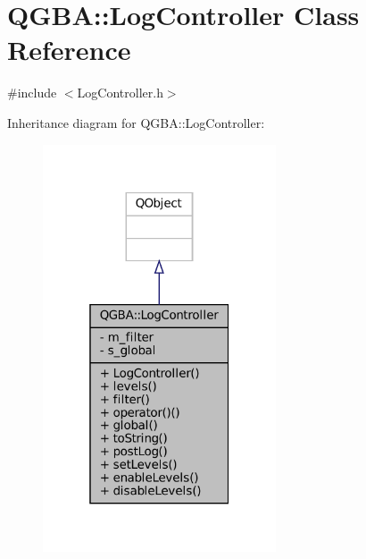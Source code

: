\hypertarget{class_q_g_b_a_1_1_log_controller}{}\section{Q\+G\+BA\+:\+:Log\+Controller Class Reference}
\label{class_q_g_b_a_1_1_log_controller}


{\ttfamily \#include $<$Log\+Controller.\+h$>$}



Inheritance diagram for Q\+G\+BA\+:\+:Log\+Controller\+:
\nopagebreak
\begin{figure}[H]
\begin{center}
\leavevmode
\includegraphics[width=196pt]{class_q_g_b_a_1_1_log_controller__inherit__graph}
\end{center}
\end{figure}


